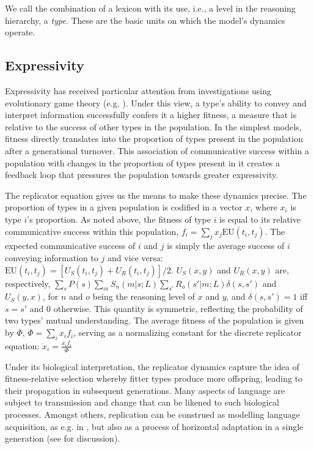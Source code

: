 \documentclass[a4paper]{article}
\begin{document}
We call the combination of a lexicon with its use, i.e., a level in the reasoning hierarchy, a {\em type}. These are the basic units on which the model's dynamics operate. 

\subsection{Expressivity}\label{sec:expressivity}
Expressivity has received particular attention from investigations using evolutionary game theory (e.g. \citealt{nowak+krakauer:1999,nowak+etal:2000, nowak+etal:2002}). Under this view, a type's ability to convey and interpret information successfully confers it a higher fitness, a measure that is relative to the success of other types in the population. In the simplest models, fitness directly translates into the proportion of types present in the population after a generational turnover. This association of communicative success within a population with changes in the proportion of types present in it creates a feedback loop that pressures the population towards greater expressivity. 

The replicator equation gives us the means to make these dynamics precise. The proportion of types in a given population is codified in a vector $x$, where $x_i$ is type $i$'s proportion. As noted above, the fitness of type $i$ is equal to its relative communicative success within this population, $f_i = \sum_j x_j \text{EU}(t_i,t_j)$. The expected communicative success of $i$ and $j$ is simply the average success of $i$ conveying information to $j$ and vice versa: $\text{EU}(t_i,t_j) = [U_S(t_i,t_j) + U_R(t_i,t_j)]/2$. $U_S(x,y)$ and $U_R(x,y)$ are, respectively, $\sum_s P(s)\sum_m S_n(m|s;L) \sum_{s'} R_o(s'|m;L) \delta(s,s')$ and $U_S(y,x)$, for $n$ and $o$ being the reasoning level of $x$ and $y$, and $\delta(s,s') = 1$ iff $s = s'$ and $0$ otherwise. This quantity is symmetric, reflecting the probability of two types' mutual understanding. The average fitness of the population is given by $\Phi$, $\Phi = \sum_i x_i f_i$, serving as a normalizing constant for the discrete replicator equation: $\dot{x}_i = \frac{x_i f_i}{\Phi}$ 

Under its biological interpretation, the replicator dynamics capture the idea of fitness-relative selection whereby fitter types produce more offspring, leading to their propagation in subsequent generations. Many aspects of language are subject to transmission and change that can be likened to such biological processes. Amongst others, replication can be construed as modelling language acquisition, as e.g. in \citealt{nowak+etal:2002}, but also as a process of horizontal adaptation in a single generation (see \citealt[\S3.3]{benz+etal:2005b} for discussion).
\end{document}
